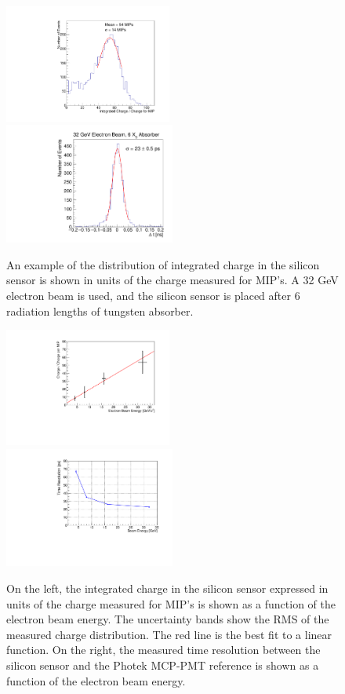 \documentclass[12pt]{article}
\begin{document}
\begin{figure}[htbp] 
\centering
\includegraphics[width=0.49\textwidth]{plots/Electron_6X0_32GeV_chargeMIP.pdf} 
\includegraphics[width=0.50\textwidth]{plots/deltaT_32GeV_6X0.pdf} 
\caption{ An example of the distribution of integrated charge in the silicon sensor is 
shown in units of the charge measured for MIP's. A 32 GeV electron beam is used, and the
silicon sensor is placed after 6 radiation lengths of tungsten absorber.} 
\label{fig:ChargeDistributionExample}
\end{figure}

\begin{figure}[htbp] 
\centering
\includegraphics[width=0.49\textwidth]{plots/MIPVsEnergyAt6X0.pdf} 
\includegraphics[width=0.50\textwidth]{plots/SigmaT_vs_BeamEnergy_lin30Stamp.pdf} 
\caption{On the left, the integrated charge in the silicon sensor expressed in units of the 
charge measured for MIP's is shown as a function of the electron beam energy. The uncertainty
bands show the RMS of the measured charge distribution. The red line is the best fit to a 
linear function. On the right, the measured time resolution between the silicon sensor and the 
Photek MCP-PMT reference is shown as a function of the electron beam energy.
} 
\label{fig:MIPVsEnergy} 
\end{figure} 
\end{document}

